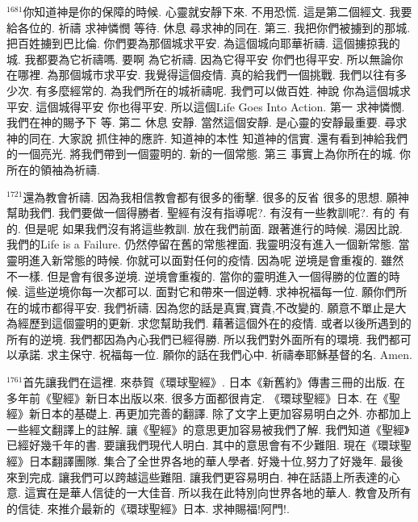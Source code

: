 \documentclass{book}
\begin{document}
$^{1681}$你知道神是你的保障的時候.
心靈就安靜下來.
不用恐慌.
這是第二個經文.
我要給各位的.
祈禱 求神憐憫 等待.
休息 尋求神的同在.
第三.
我把你們被擄到的那城.
把百姓擄到巴比倫.
你們要為那個城求平安.
為這個城向耶華祈禱.
這個擄掠我的城.
我都要為它祈禱嗎.
要啊 為它祈禱.
因為它得平安 你們也得平安.
所以無論你在哪裡.
為那個城市求平安.
我覺得這個疫情.
真的給我們一個挑戰.
我們以往有多少次.
有多麼經常的.
為我們所在的城祈禱呢.
我們可以做百姓.
神說 你為這個城求平安.
這個城得平安 你也得平安.
所以這個Life Goes Into Action.
第一 求神憐憫.
我們在神的賜予下 等.
第二 休息 安靜.
當然這個安靜.
是心靈的安靜最重要.
尋求神的同在.
大家說 抓住神的應許.
知道神的本性 知道神的信實.
還有看到神給我們的一個亮光.
將我們帶到一個靈明的.
新的一個常態.
第三 事實上為你所在的城.
你所在的領袖為祈禱.

$^{1721}$還為教會祈禱.
因為我相信教會都有很多的衝擊.
很多的反省 很多的思想.
願神幫助我們.
我們要做一個得勝者.
聖經有沒有指導呢?.
有沒有一些教訓呢?.
有的 有的.
但是呢 如果我們沒有將這些教訓.
放在我們前面.
跟著進行的時候.
湯因比說.
我們的Life is a Failure.
仍然停留在舊的常態裡面.
我靈明沒有進入一個新常態.
當靈明進入新常態的時候.
你就可以面對任何的疫情.
因為呢 逆境是會重複的.
雖然不一樣.
但是會有很多逆境.
逆境會重複的.
當你的靈明進入一個得勝的位置的時候.
這些逆境你每一次都可以.
面對它和帶來一個逆轉.
求神祝福每一位.
願你們所在的城市都得平安.
我們祈禱.
因為您的話是真實,寶貴,不改變的.
願意不單止是大為經歷到這個靈明的更新.
求您幫助我們.
藉著這個外在的疫情.
或者以後所遇到的所有的逆境.
我們都因為內心我們已經得勝.
所以我們對外面所有的環境.
我們都可以承諾.
求主保守.
祝福每一位.
願你的話在我們心中.
祈禱奉耶穌基督的名.
Amen.

$^{1761}$首先讓我們在這裡.
來恭賀《環球聖經》.
日本《新舊約》傳書三冊的出版.
在多年前《聖經》新日本出版以來.
很多方面都很肯定.
《環球聖經》日本.
在《聖經》新日本的基礎上.
再更加完善的翻譯.
除了文字上更加容易明白之外.
亦都加上一些經文翻譯上的註解.
讓《聖經》的意思更加容易被我們了解.
我們知道《聖經》已經好幾千年的書.
要讓我們現代人明白.
其中的意思會有不少難阻.
現在《環球聖經》日本翻譯團隊.
集合了全世界各地的華人學者.
好幾十位,努力了好幾年.
最後來到完成.
讓我們可以跨越這些難阻.
讓我們更容易明白.
神在話語上所表達的心意.
這實在是華人信徒的一大佳音.
所以我在此特別向世界各地的華人.
教會及所有的信徒.
來推介最新的《環球聖經》日本.
求神賜福!阿門!.
\newpage
\end{document}
